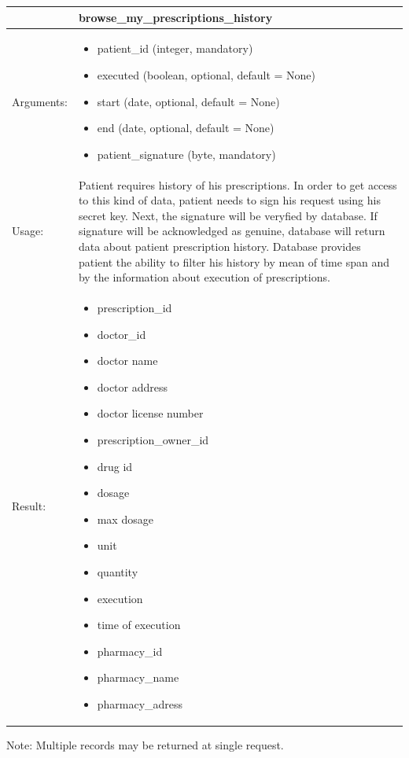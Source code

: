 
    \begin{longtable}{| p{6cm} | p{7.75cm} |}
    \hline
     & browse\_my\_prescriptions\_history \\ \hline
    Arguments: &  \begin{itemize}
    	\item patient\_id (integer, mandatory)
		\item executed (boolean, optional, default = None)
		\item start (date, optional, default = None)
		\item end (date, optional, default = None)
		\item patient\_signature (byte, mandatory)
	\end{itemize}     \\ \hline
    Usage: & Patient requires history of his prescriptions. In order to get access to this kind of data, patient needs to sign his request using his secret key. Next, the signature will be veryfied by database. If signature will be acknowledged as genuine, database will return data about patient prescription history. Database provides patient the ability to filter his history by mean of time span and by the information about execution of prescriptions. \\ \hline
    Result: & \begin{itemize}
    	\item prescription\_id
    	\item doctor\_id
    	\item doctor name
    	\item doctor address
    	\item doctor license number
    	\item prescription\_owner\_id
    	\item drug id
    	\item dosage
    	\item max dosage
    	\item unit
    	\item quantity
    	\item execution
    	\item time of execution
    	\item pharmacy\_id
    	\item pharmacy\_name
    	\item pharmacy\_adress
	\end{itemize}     \\ \hline	
    \end{longtable}
Note: Multiple records may be returned at single request.


